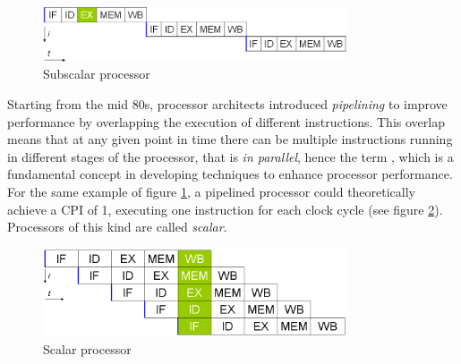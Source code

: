 \begin{figure}[hbtp]
  \centering
  \includegraphics[width=0.8\textwidth]{img/subscalar.png}
  \caption{Subscalar processor}
  \label{fig:subscalar}
\end{figure}

Starting from the mid 80s, processor architects introduced \emph{pipelining} to improve performance by overlapping the execution of different instructions. This overlap means that at any given point in time there can be multiple instructions running in different stages of the processor, that is \emph{in parallel}, hence the term , which is a fundamental concept in developing techniques to enhance processor performance. For the same example of figure \ref{fig:subscalar}, a pipelined processor could theoretically achieve a \ac{CPI} of 1, executing one instruction for each clock cycle (see figure \ref{fig:scalar}). Processors of this kind are called \emph{scalar}.

\begin{figure}[hbtp]
  \centering
  \includegraphics[width=0.8\textwidth]{img/scalar.png}
  \caption{Scalar processor}
  \label{fig:scalar}
\end{figure}

